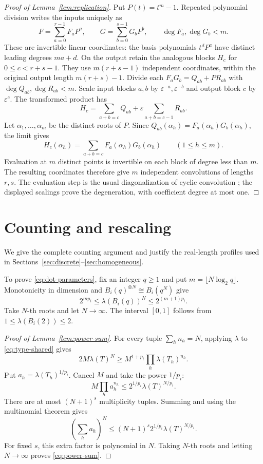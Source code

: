 \documentclass[11pt]{article}
\begin{document}
\begin{proof}[Proof of Lemma~\ref{lem:replication}]
Put $P(t)=t^m-1$. Repeated polynomial division writes the inputs uniquely as
\[
 F=\sum_{a=0}^{r-1}F_aP^a,\qquad
 G=\sum_{b=0}^{s-1}G_bP^b,\qquad \deg F_a,\deg G_b<m.
\]
These are invertible linear coordinates: the basis polynomials $t^dP^a$
have distinct leading degrees $ma+d$. On the output retain the analogous
blocks $H_c$ for $0\le c<r+s-1$. They use $m(r+s-1)$ independent
coordinates, within the original output length $m(r+s)-1$.
Divide each $F_aG_b=Q_{ab}+PR_{ab}$ with $\deg Q_{ab},\deg R_{ab}<m$.
Scale input blocks $a,b$ by $\varepsilon^{-a},\varepsilon^{-b}$ and output
block $c$ by $\varepsilon^c$. The transformed product has
\[
 H_c=\sum_{a+b=c}Q_{ab}
       +\varepsilon\sum_{a+b=c-1}R_{ab}.
\]
Let $\alpha_1,\ldots,\alpha_m$ be the distinct roots of $P$.
Since $Q_{ab}(\alpha_h)=F_a(\alpha_h)G_b(\alpha_h)$, the limit gives
\[
 H_c(\alpha_h)=\sum_{a+b=c}F_a(\alpha_h)G_b(\alpha_h)
 \qquad(1\le h\le m).
\]
Evaluation at $m$ distinct points is invertible on each block of degree
less than $m$. The resulting coordinates therefore give $m$ independent
convolutions of lengths $r,s$.
The evaluation step is the usual diagonalization of cyclic convolution
\cite[Theorem~5 and Section~5.1]{ju-solomonik-2020-convolution}; the displayed
scalings prove the degeneration, with coefficient degree at most one.
\end{proof}
\section{Counting and rescaling}\label{app:counting-rescaling}

We give the complete counting argument and justify the real-length
profiles used in Sections~\ref{sec:discrete}--\ref{sec:homogeneous}.

To prove \eqref{eq:dot-parameters}, fix an integer $q\ge1$ and put
$m=\lfloor N\log_2q\rfloor$. Monotonicity in dimension
and $B_i(q)^{\otimes N}\cong B_i(q^N)$ give
\[
 2^{mp_i}\le\lambda(B_i(q))^N\le2^{(m+1)p_i}.
\]
Take $N$-th roots and let $N\to\infty$. The interval $[0,1]$ follows
from $1\le\lambda(B_i(2))\le2$.

\begin{proof}[Proof of Lemma~\ref{lem:power-sum}]
For every tuple $\sum_h n_h=N$, applying $\lambda$ to
\eqref{eq:type-shared} gives
\[
 2M\lambda(T)^N\ge M^{1+p_i}\prod_h\lambda(T_h)^{n_h}.
\]
Put $a_h=\lambda(T_h)^{1/p_i}$. Cancel $M$ and take the power $1/p_i$:
\[
 M\prod_h a_h^{n_h}\le2^{1/p_i}\lambda(T)^{N/p_i}.
\]
There are at most $(N+1)^s$ multiplicity tuples. Summing and using the multinomial
theorem gives
\[
 \left(\sum_h a_h\right)^N
 \le(N+1)^s2^{1/p_i}\lambda(T)^{N/p_i}.
\]
For fixed $s$, this extra factor is polynomial in $N$. Taking
$N$-th roots and letting $N\to\infty$ proves \eqref{eq:power-sum}.
\end{proof}
\end{document}

